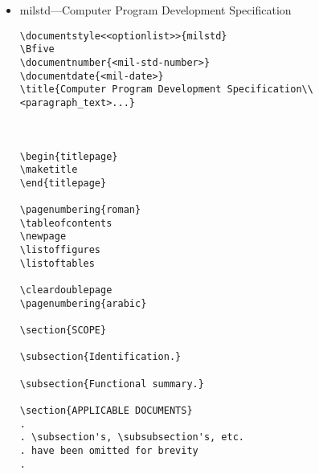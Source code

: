 \begin{itemize}
\begin{small}
\begin{verbatim}
\section{<text>} % Section 20, Appendix II


\end{verbatim}
\end{small}

\item milstd---Computer Program Development Specification 

\begin{small}
\begin{verbatim}
\documentstyle<<optionlist>>{milstd}
\Bfive
\documentnumber{<mil-std-number>}
\documentdate{<mil-date>}
\title{Computer Program Development Specification\\
<paragraph_text>...}



\begin{titlepage}
\maketitle
\end{titlepage}

\pagenumbering{roman}
\tableofcontents
\newpage
\listoffigures
\listoftables

\cleardoublepage
\pagenumbering{arabic}

\section{SCOPE}

\subsection{Identification.}

\subsection{Functional summary.}

\section{APPLICABLE DOCUMENTS}
.
. \subsection's, \subsubsection's, etc. 
. have been omitted for brevity
.  


\end{verbatim}
\end{small}
\end{itemize}
